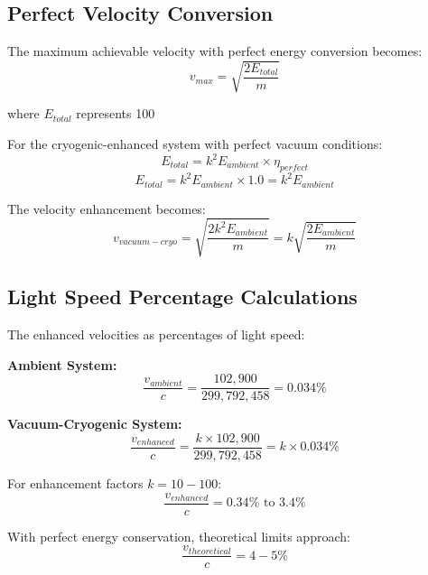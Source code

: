 \documentclass[12pt,a4paper]{article}
\begin{document}
\subsection{Perfect Velocity Conversion}

The maximum achievable velocity with perfect energy conversion becomes:
\begin{equation}
v_{max} = \sqrt{\frac{2E_{total}}{m}}
\end{equation}

where $E_{total}$ represents 100%

For the cryogenic-enhanced system with perfect vacuum conditions:
\begin{equation}
E_{total} = k^2 E_{ambient} \times \eta_{perfect}
\end{equation}
\begin{equation}
E_{total} = k^2 E_{ambient} \times 1.0 = k^2 E_{ambient}
\end{equation}

The velocity enhancement becomes:
\begin{equation}
v_{vacuum-cryo} = \sqrt{\frac{2k^2 E_{ambient}}{m}} = k\sqrt{\frac{2E_{ambient}}{m}}
\end{equation}

\subsection{Light Speed Percentage Calculations}

The enhanced velocities as percentages of light speed:

\textbf{Ambient System:}
\begin{equation}
\frac{v_{ambient}}{c} = \frac{102,900}{299,792,458} = 0.034\%
\end{equation}

\textbf{Vacuum-Cryogenic System:}
\begin{equation}
\frac{v_{enhanced}}{c} = \frac{k \times 102,900}{299,792,458} = k \times 0.034\%
\end{equation}

For enhancement factors $k = 10-100$:
\begin{equation}
\frac{v_{enhanced}}{c} = 0.34\% \text{ to } 3.4\%
\end{equation}

With perfect energy conservation, theoretical limits approach:
\begin{equation}
\frac{v_{theoretical}}{c} = 4-5\%
\end{equation}
\end{document}
